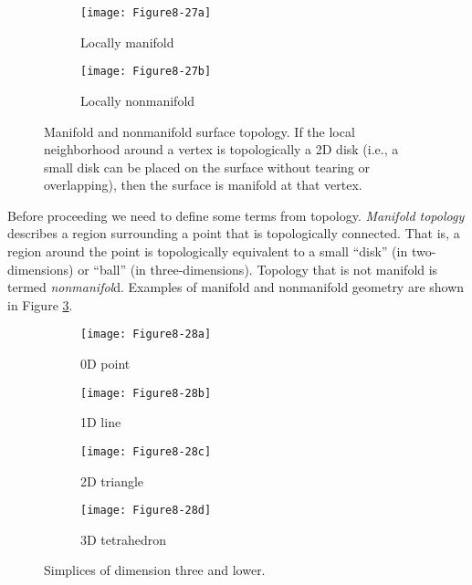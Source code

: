 \begin{figure}[!htb]
    \centering
    \begin{subfigure}{0.48\linewidth}
        \centering
        \texttt{[image: Figure8-27a]}
        \caption*{Locally manifold}\label{fig:Figure8-27a}
    \end{subfigure}
    \hfill
    \begin{subfigure}{0.48\linewidth}
        \centering
        \texttt{[image: Figure8-27b]}
        \caption*{Locally nonmanifold}\label{fig:Figure8-27b}
    \end{subfigure}%
    \caption{Manifold and nonmanifold surface topology. If the local neighborhood around a vertex is topologically a 2D disk (i.e., a small disk can be placed on the surface without tearing or overlapping), then the surface is manifold at that vertex.}
    \label{fig:Figure8-27}
\end{figure}

Before proceeding we need to define some terms from topology. \emph{Manifold topology} describes a region surrounding a point that is topologically connected. That is, a region around the point is topologically equivalent to a small ``disk'' (in two-dimensions) or ``ball'' (in three-dimensions). Topology that is not manifold is termed \emph{nonmanifol}d. Examples of manifold and nonmanifold geometry are shown in Figure \ref{fig:Figure8-27}.

\begin{figure}[!htb]
    \centering
    \begin{subfigure}{0.24\linewidth}
        \centering
        \texttt{[image: Figure8-28a]}
        \caption*{0D point}\label{fig:Figure8-28a}
    \end{subfigure}
    \hfill
    \begin{subfigure}{0.24\linewidth}
        \centering
        \texttt{[image: Figure8-28b]}
        \caption*{1D line}\label{fig:Figure8-28b}
    \end{subfigure}%
    \hfill
    \begin{subfigure}{0.24\linewidth}
        \centering
        \texttt{[image: Figure8-28c]}
        \caption*{2D triangle}\label{fig:Figure8-28c}
    \end{subfigure}%
    \hfill
    \begin{subfigure}{0.24\linewidth}
        \centering
        \texttt{[image: Figure8-28d]}
        \caption*{3D tetrahedron}\label{fig:Figure8-28d}
    \end{subfigure}%
    \caption{Simplices of dimension three and lower.}
    \label{fig:Figure8-28}
\end{figure}

